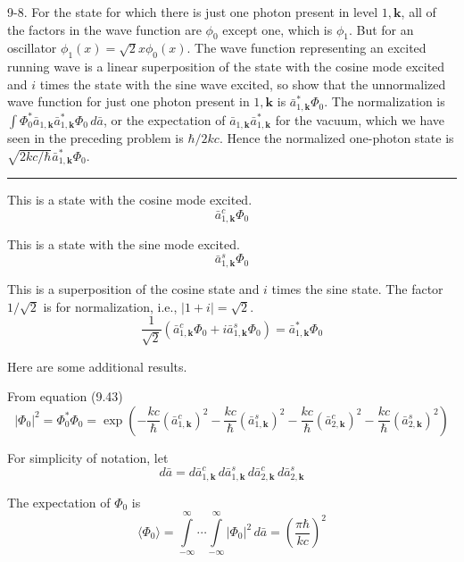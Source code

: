 \documentclass[12pt]{article}
\newcommand\U{\vert\Phi_0\vert^2}
\begin{document}
9-8.
For the state for which there is just one photon
present in level $1,\mathbf k$, all of the factors in the wave function are
$\phi_0$ except one, which is $\phi_1$.
But for an oscillator $\phi_1(x)=\sqrt2x\phi_0(x)$.
The wave function representing an excited running wave is a linear
superposition of the state with the cosine mode excited and $i$
times the state with the sine wave excited, so show that the
unnormalized wave function for just one photon present in
$1,\mathbf k$ is $\bar a_{1,\mathbf k}^*\Phi_0$.
The normalization is
$\int\Phi_0^*\bar a_{1,\mathbf k}\bar a_{1,\mathbf k}^*\Phi_0\,d\bar a$,
or the expectation of $\bar a_{1,\mathbf k}\bar a_{1,\mathbf k}^*$ for the
vacuum, which we have seen in the preceding problem is $\hbar/2kc$.
Hence the normalized one-photon state is
$\sqrt{2kc/\hbar}\bar a_{1,\mathbf k}^*\Phi_0$.

\bigskip
\hrule

\bigskip
This is a state with the cosine mode excited.
\begin{equation*}
\bar a_{1,\mathbf k}^c\Phi_0
\end{equation*}

This is a state with the sine mode excited.
\begin{equation*}
\bar a_{1,\mathbf k}^s\Phi_0
\end{equation*}

This is a superposition of the cosine state and $i$ times the sine state.
The factor $1/\sqrt2$ is for normalization, i.e., $|1+i|=\sqrt2$.
\begin{equation*}
\frac{1}{\sqrt2}\left(\bar a_{1,\mathbf k}^c\Phi_0+i\bar a_{1,\mathbf k}^s\Phi_0\right)
=\bar a_{1,\mathbf k}^*\Phi_0
\end{equation*}

Here are some additional results.

\bigskip
From equation (9.43)
\begin{equation*}
\U=\Phi_0^*\Phi_0=\exp\left(
-\frac{kc}{\hbar}(\bar a_{1,\mathbf k}^c)^2-\frac{kc}{\hbar}(\bar a_{1,\mathbf k}^s)^2
-\frac{kc}{\hbar}(\bar a_{2,\mathbf k}^c)^2-\frac{kc}{\hbar}(\bar a_{2,\mathbf k}^s)^2
\right)
\end{equation*}

For simplicity of notation, let
\begin{equation*}
d\bar a=
d\bar a_{1,\mathbf k}^c\,d\bar a_{1,\mathbf k}^s
\,d\bar a_{2,\mathbf k}^c\,d\bar a_{2,\mathbf k}^s
\end{equation*}

The expectation of $\Phi_0$ is
\begin{equation*}
\langle\Phi_0\rangle=
\int\limits_{-\infty}^\infty\cdots
\int\limits_{-\infty}^\infty
\U\,d\bar a
=\left(\frac{\pi\hbar}{kc}\right)^2
\tag{1}
\end{equation*}
\end{document}
